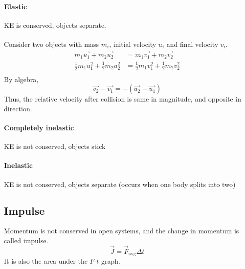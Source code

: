 \documentclass[a4paper]{article}
\begin{document}
\begin{multicols*}{4}
      \paragraph{Elastic} KE is conserved, objects separate.
      \\\\
      Consider two objects with mass $m_i$, initial velocity $u_i$ and final velocity $v_i$.
        \begin{align*}
          m_1 \vec{u_1} + m_2 \vec{u_2} &= m_1 \vec{v_1} + m_2 \vec{v_2} \\
          \frac{1}{2} m_1 u_1^2 + \frac{1}{2} m_2 u_2^2 &= \frac{1}{2} m_1 v_1^2 + \frac{1}{2} m_2 v_2^2 \\
        \end{align*}
        By algebra,
        \[ \vec{v_2} - \vec{v_1} = -(\vec{u_2} - \vec{u_1}) \]
        Thus, the relative velocity after collision is same in magnitude, and opposite in direction.
      \paragraph{Completely inelastic} KE is not conserved, objects stick
      \paragraph{Inelastic} KE is not conserved, objects separate (occurs when one body splits into two)
    \subsection*{Impulse}
      Momentum is not conserved in open systems, and the change in momentum is called impulse.
      \[ \vec{J} = \vec{F}_\text{avg} \Delta t \]
      It is also the area under the $F$-$t$ graph.
\end{multicols*}
\end{document}

